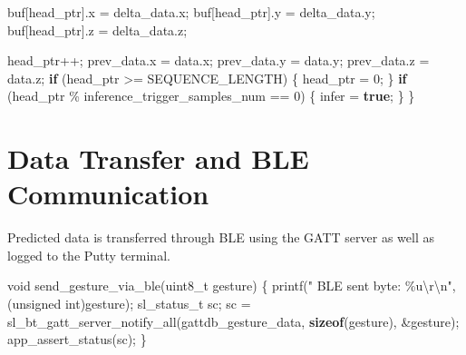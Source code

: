 \documentclass[
  9pt,
  letterpaper,
  abstract,
  titlepage]{scrbook}
\newenvironment{Shaded}{\begin{snugshade}}{\end{snugshade}}
\newcommand{\ControlFlowTok}[1]{\textcolor[rgb]{0.00,0.23,0.31}{\textbf{#1}}}
\newcommand{\DataTypeTok}[1]{\textcolor[rgb]{0.68,0.00,0.00}{#1}}
\newcommand{\DecValTok}[1]{\textcolor[rgb]{0.68,0.00,0.00}{#1}}
\newcommand{\KeywordTok}[1]{\textcolor[rgb]{0.00,0.23,0.31}{\textbf{#1}}}
\newcommand{\NormalTok}[1]{\textcolor[rgb]{0.00,0.23,0.31}{#1}}
\newcommand{\OperatorTok}[1]{\textcolor[rgb]{0.37,0.37,0.37}{#1}}
\newcommand{\SpecialCharTok}[1]{\textcolor[rgb]{0.37,0.37,0.37}{#1}}
\newcommand{\StringTok}[1]{\textcolor[rgb]{0.13,0.47,0.30}{#1}}
\begin{document}
\begin{Shaded}
\begin{Highlighting}[]
\NormalTok{  buf}\OperatorTok{[}\NormalTok{head\_ptr}\OperatorTok{].}\NormalTok{x }\OperatorTok{=}\NormalTok{ delta\_data}\OperatorTok{.}\NormalTok{x}\OperatorTok{;}
\NormalTok{  buf}\OperatorTok{[}\NormalTok{head\_ptr}\OperatorTok{].}\NormalTok{y }\OperatorTok{=}\NormalTok{ delta\_data}\OperatorTok{.}\NormalTok{y}\OperatorTok{;}
\NormalTok{  buf}\OperatorTok{[}\NormalTok{head\_ptr}\OperatorTok{].}\NormalTok{z }\OperatorTok{=}\NormalTok{ delta\_data}\OperatorTok{.}\NormalTok{z}\OperatorTok{;}

\NormalTok{  head\_ptr}\OperatorTok{++;}
\NormalTok{  prev\_data}\OperatorTok{.}\NormalTok{x }\OperatorTok{=}\NormalTok{ data}\OperatorTok{.}\NormalTok{x}\OperatorTok{;}
\NormalTok{  prev\_data}\OperatorTok{.}\NormalTok{y }\OperatorTok{=}\NormalTok{ data}\OperatorTok{.}\NormalTok{y}\OperatorTok{;}
\NormalTok{  prev\_data}\OperatorTok{.}\NormalTok{z }\OperatorTok{=}\NormalTok{ data}\OperatorTok{.}\NormalTok{z}\OperatorTok{;}
  \ControlFlowTok{if} \OperatorTok{(}\NormalTok{head\_ptr }\OperatorTok{\textgreater{}=}\NormalTok{ SEQUENCE\_LENGTH}\OperatorTok{)} \OperatorTok{\{}
\NormalTok{    head\_ptr }\OperatorTok{=} \DecValTok{0}\OperatorTok{;}
  \OperatorTok{\}}
  \ControlFlowTok{if} \OperatorTok{(}\NormalTok{head\_ptr }\OperatorTok{\%}\NormalTok{ inference\_trigger\_samples\_num }\OperatorTok{==} \DecValTok{0}\OperatorTok{)} \OperatorTok{\{}
\NormalTok{    infer }\OperatorTok{=} \KeywordTok{true}\OperatorTok{;}
  \OperatorTok{\}}
\OperatorTok{\}}
\end{Highlighting}
\end{Shaded}

\section{Data Transfer and BLE
Communication}\label{data-transfer-and-ble-communication}

Predicted data is transferred through BLE using the GATT server as well
as logged to the Putty terminal.

\begin{Shaded}
\begin{Highlighting}[]
\DataTypeTok{void}\NormalTok{ send\_gesture\_via\_ble}\OperatorTok{(}\DataTypeTok{uint8\_t}\NormalTok{ gesture}\OperatorTok{)}
\OperatorTok{\{}
\NormalTok{    printf}\OperatorTok{(}\StringTok{" BLE sent byte: }\SpecialCharTok{\%u\textbackslash{}r\textbackslash{}n}\StringTok{"}\OperatorTok{,} \OperatorTok{(}\DataTypeTok{unsigned} \DataTypeTok{int}\OperatorTok{)}\NormalTok{gesture}\OperatorTok{);}
\NormalTok{    sl\_status\_t sc}\OperatorTok{;}
\NormalTok{    sc }\OperatorTok{=}\NormalTok{ sl\_bt\_gatt\_server\_notify\_all}\OperatorTok{(}\NormalTok{gattdb\_gesture\_data}\OperatorTok{,}
                                        \KeywordTok{sizeof}\OperatorTok{(}\NormalTok{gesture}\OperatorTok{),}
                                        \OperatorTok{\&}\NormalTok{gesture}\OperatorTok{);}
\NormalTok{    app\_assert\_status}\OperatorTok{(}\NormalTok{sc}\OperatorTok{);}
\OperatorTok{\}}
\end{Highlighting}
\end{Shaded}
\end{document}
